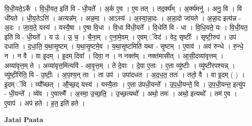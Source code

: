 \documentclass[17pt]{extarticle}
\begin{document}
वि॒धी॒यते॒ऽर्के । वि॒धी॒यत॒ इति॑ वि - धी॒यते᳚ । अ॒र्क ए॒व । ए॒व तत् । तद॒र्क्य᳚म् । अ॒र्क्य॑मनु॑ । अनु॒ वि । वि धी॑यते । धी॒य॒तेऽत्ति॑ । अत्यन्न᳚म् । अन्न॒मा । आऽस्य॑ । अ॒स्या॒न्ना॒दः । अ॒न्ना॒दो जा॑यते । अ॒न्ना॒द इत्य॑न्न - अ॒दः । जा॒य॒ते॒ यस्य॑ । यस्यै॒षा । ए॒षा वि॒धा । वि॒धा वि॑धी॒यते᳚ । वि॒धेति॑ वि - धा । वि॒धि॒यते॒ यः । वि॒धी॒यत॒ इति॑ वि - धी॒यते᳚ । य उ॑ । उ॒ च॒ । चै॒ना॒म् । ए॒ना॒मे॒वम् । ए॒वम् ॅवेद॑ । वेद॒ सृष्टीः᳚ । सृष्टी॒रुप॑ । उप॑ दधाति । द॒धा॒ति॒ य॒था॒सृ॒ष्टम् । य॒था॒सृ॒ष्टमे॒व । य॒था॒सृ॒ष्टमिति॑ यथा - सृ॒ष्टम् । ए॒वाव॑ । अव॑ रुन्धे । रु॒न्धे॒ न । न वै । वा इ॒दम् । इ॒दम् दिवा᳚ । दिवा॒ न । न नक्त᳚म् । नक्त॑मासीत् । आ॒सी॒दव्या॑वृत्तम् । अव्या॑वृत्त॒म् ते । अव्या॑वृत्त॒मित्यवि॑ - आ॒वृ॒त्त॒म् । ते दे॒वाः । दे॒वा ए॒ताः । ए॒ता व्यु॑ष्टीः । व्यु॑ष्टीरपश्यन्न् । व्यु॑ष्टी॒रिति॒ वि - उ॒ष्टीः॒ । अ॒प॒श्य॒न् ताः । ता उप॑ । उपा॑दधत । अ॒द॒ध॒त॒ ततः॑ । ततो॒ वै । वा इ॒दम् ( ) । इ॒दम् ॅवि । व्यौ᳚च्छत् । औ॒च्छ॒द् यस्य॑ । यस्यै॒ताः । ए॒ता उ॑पधी॒यन्ते᳚ । उ॒प॒धी॒यन्ते॒ वि । उ॒प॒धी॒यन्त॒ इत्यु॑प - धी॒यन्ते᳚ । व्ये॑व । ए॒वास्मै᳚ । अ॒स्मा॒ उ॒च्छ॒ति॒ । उ॒च्छ॒त्यथो᳚ । अथो॒ तमः॑ । अथो॒ इत्यथो᳚ । तम॑ ए॒व । ए॒वाप॑ । अप॑ हते । ह॒त॒ इति॑ हते । \newline

\textbf{Jatai Paata} \newline
\end{document}
